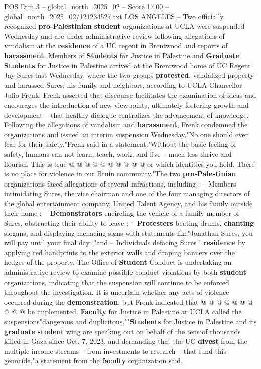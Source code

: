 \begin{textsample}{POS Dim 3 – global\_north\_2025\_02 – Score 17.00 – global\_north\_2025\_02/121234527.txt}  \label{ex:f3_pos_293}
LOS ANGELES -- Two officially recognized \textbf{pro-Palestinian} \textbf{student} organizations at UCLA were suspended Wednesday and are under administrative review following allegations of vandalism at the \textbf{residence} of a UC regent in Brentwood and reports of \textbf{harassment}.
Members of \textbf{Students} for Justice in Palestine and \textbf{Graduate} \textbf{Students} for Justice in Palestine arrived at the Brentwood home of UC Regent Jay Sures last Wednesday, where the two groups \textbf{protested}, vandalized property and harassed Sures, his family and neighbors, according to UCLA Chancellor Julio Frenk.
Frenk asserted that discourse facilitates the examination of ideas and encourages the introduction of new viewpoints, ultimately fostering growth and development -- that healthy dialogue centralizes the advancement of knowledge.
Following the allegations of vandalism and \textbf{harassment}, Frenk condemned the organizations and issued an interim suspension Wednesday."No one should ever fear for their safety,"Frenk said in a statement."Without the basic feeling of safety, humans can not learn, teach, work, and live -- much less thrive and flourish.
This is true @ @ @ @ @ @ @ @ @ @ or which identities you hold.
There is no place for violence in our Bruin community."The two \textbf{pro-Palestinian} organizations faced allegations of several infractions, including : -- Members intimidating Sures, the vice chairman and one of the four managing directors of the global entertainment company, United Talent Agency, and his family outside their home ; -- \textbf{Demonstrators} encircling the vehicle of a family member of Sures, obstructing their ability to leave ; -- \textbf{Protesters} beating drums, \textbf{chanting} slogans, and displaying menacing signs with statements like"Jonathan Sures, you will pay until your final day ;"and -- Individuals defacing Sures ' \textbf{residence} by applying red handprints to the exterior walls and draping banners over the hedges of the property.
The Office of \textbf{Student} Conduct is undertaking an administrative review to examine possible conduct violations by both \textbf{student} organizations, indicating that the suspension will continue to be enforced throughout the investigation.
It is uncertain whether any acts of violence occurred during the \textbf{demonstration}, but Frenk indicated that @ @ @ @ @ @ @ @ @ @ be implemented. \textbf{Faculty} for Justice in Palestine at UCLA called the suspensions"dangerous and duplicitous.""\textbf{Students} for Justice in Palestine and its \textbf{graduate} \textbf{student} wing are speaking out on behalf of the tens of thousands killed in Gaza since Oct. 7, 2023, and demanding that the UC \textbf{divest} from the multiple income streams -- from investments to research -- that fund this genocide,"a statement from the \textbf{faculty} organization said.

\end{textsample}
